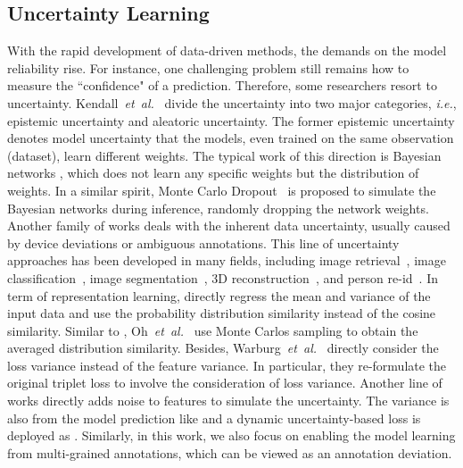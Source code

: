\documentclass[10pt,twocolumn,letterpaper]{article}
\def\ie{\emph{i.e.}}
\def\etal{\emph{et~al.}}
\begin{document}
\subsection{Uncertainty Learning} 
With the rapid development of data-driven methods, the demands on the model reliability rise. For instance, one challenging problem still remains how to measure the ``confidence" of a prediction. Therefore, some researchers resort to uncertainty. 
Kendall~\etal~\cite{uncertainty} divide the uncertainty into two major categories, \ie, epistemic uncertainty and aleatoric uncertainty. The former epistemic uncertainty denotes model uncertainty that the models, even trained on the same observation (dataset), learn different weights. The typical work of this direction is Bayesian networks \cite{bnn_2007, gal2016dropout}, which does not learn any specific weights but the distribution of weights.  
In a similar spirit, Monte Carlo Dropout~\cite{gal2016dropout} is proposed to simulate the Bayesian networks during inference, randomly dropping the network weights. 
Another family of works deals with the inherent data uncertainty, usually caused by device deviations or ambiguous annotations. This line of uncertainty approaches has been developed in many fields, including image retrieval~\cite{Warburg2021BayesianTL}, image classification~\cite{DBLP:journals/corr/abs-2107-00649}, image segmentation~\cite{zheng2021rectifyingijcv}, 3D reconstruction~\cite{DBLP:journals/corr/abs-2109-13912}, and person re-id~\cite{Robust_uncertainty,zhang2022implicit}. 
In term of representation learning, \cite{chun2021probabilistic,pishdad2022uncertainty} directly regress the mean and variance of the input data and use the probability distribution similarity instead of the cosine similarity. 
Similar to \cite{chun2021probabilistic,pishdad2022uncertainty}, Oh~\etal~\cite{oh2018modeling} use Monte Carlos sampling to obtain the averaged distribution similarity.
Besides, Warburg~\etal~\cite{Warburg2021BayesianTL} directly consider the loss variance instead of the feature variance. In particular, they re-formulate the original triplet loss to involve the consideration of loss variance.
Another line of works \cite{chang2020data,dou2022reliability} directly adds noise to features to simulate the uncertainty. The variance is also from the model prediction like \cite{chun2021probabilistic,pishdad2022uncertainty} and a dynamic uncertainty-based loss is deployed as \cite{uncertainty,zheng2021rectifyingijcv}. 
Similarly, in this work, we also focus on enabling the model learning from multi-grained annotations, which can be viewed as an annotation deviation. 
\end{document}
